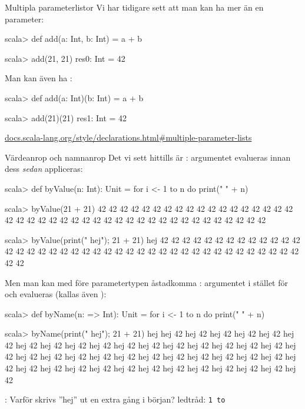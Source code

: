 \begin{Slide}{Multipla parameterlistor}
Vi har tidigare sett att man kan ha mer än en parameter:
\begin{REPLnonum}
scala> def add(a: Int, b: Int) = a + b

scala> add(21, 21)
res0: Int = 42
\end{REPLnonum}\pause
Man kan även ha  :
\begin{REPLnonum}
scala> def add(a: Int)(b: Int) = a + b

scala> add(21)(21)
res1: Int = 42
\end{REPLnonum}

\href{http://docs.scala-lang.org/style/declarations.html#multiple-parameter-lists}{\SlideFontTiny docs.scala-lang.org/style/declarations.html\#multiple-parameter-lists}
\end{Slide}



\begin{Slide}{Värdeanrop och namnanrop}\SlideFontSmall
Det vi sett hittills är : argumentet evalueras  innan dess  \emph{sedan} appliceras:
\begin{REPL}
scala> def byValue(n: Int): Unit = for i <- 1 to n do print(" " + n)

scala> byValue(21 + 21)
 42 42 42 42 42 42 42 42 42 42 42 42 42 42 42 42 42 42 42 42 42 42 42 42 42 42 42 42 42 42 42 42 42 42 42 42 42 42 42 42 42 42

scala> byValue({print(" hej"); 21 + 21})
 hej 42 42 42 42 42 42 42 42 42 42 42 42 42 42 42 42 42 42 42 42 42 42 42 42 42 42 42 42 42 42 42 42 42 42 42 42 42 42 42 42 42 42
\end{REPL}
\pause
Men man kan med \code{=>} före parametertypen åstadkomma : argumentet  i stället för  och evalueras  (kallas även ):
\begin{REPL}
scala> def byName(n: => Int): Unit = for i <- 1 to n do print(" " + n)

scala> byName({print(" hej"); 21 + 21})
 hej hej 42 hej 42 hej 42 hej 42 hej 42 hej 42 hej 42 hej 42 hej 42 hej 42 hej 42 hej 42 hej 42 hej 42 hej 42 hej 42 hej 42 hej 42 hej 42 hej 42 hej 42 hej 42 hej 42 hej 42 hej 42 hej 42 hej 42 hej 42 hej 42 hej 42 hej 42 hej 42 hej 42 hej 42 hej 42 hej 42 hej 42 hej 42 hej 42 hej 42 hej 42 hej 42
\end{REPL}
: Varför skrivs ''hej'' ut en extra gång i början? \pause ledtråd: \texttt{1 to }
\end{Slide}

